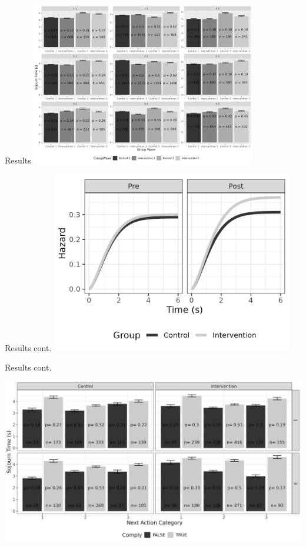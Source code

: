 \documentclass[
  ignorenonframetext,
]{beamer}
\begin{document}
\begin{frame}{Results}
\label{results}
\includegraphics[width=\textwidth,height=2.8125in]{figures/generalSojournTimes.png}
\end{frame}

\begin{frame}{Results cont.}
\label{results-cont.}
\includegraphics[width=\textwidth,height=3.125in]{figures/allTransOnetoOne.png}
\end{frame}

\begin{frame}{Results cont.}
\label{results-cont.-1}
\includegraphics[width=\textwidth,height=3.125in]{figures/complySojournTimes.png}
\end{frame}
\end{document}

